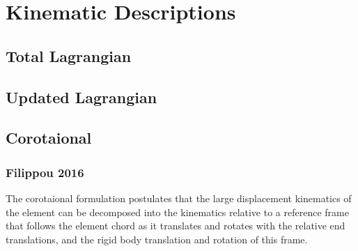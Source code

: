 \hypertarget{kinematic-descriptions}{%
\section{Kinematic Descriptions}\label{kinematic-descriptions}}

\hypertarget{total-lagrangian}{%
\subsection{Total Lagrangian}\label{total-lagrangian}}

\hypertarget{updated-lagrangian}{%
\subsection{Updated Lagrangian}\label{updated-lagrangian}}

\hypertarget{corotaional}{%
\subsection{Corotaional}\label{corotaional}}

\hypertarget{filippou-2016}{%
\subsubsection{Filippou 2016}\label{filippou-2016}}

The corotaional formulation postulates that the large displacement
kinematics of the element can be decomposed into the kinematics relative
to a reference frame that follows the element chord as it translates and
rotates with the relative end translations, and the rigid body
translation and rotation of this frame.
